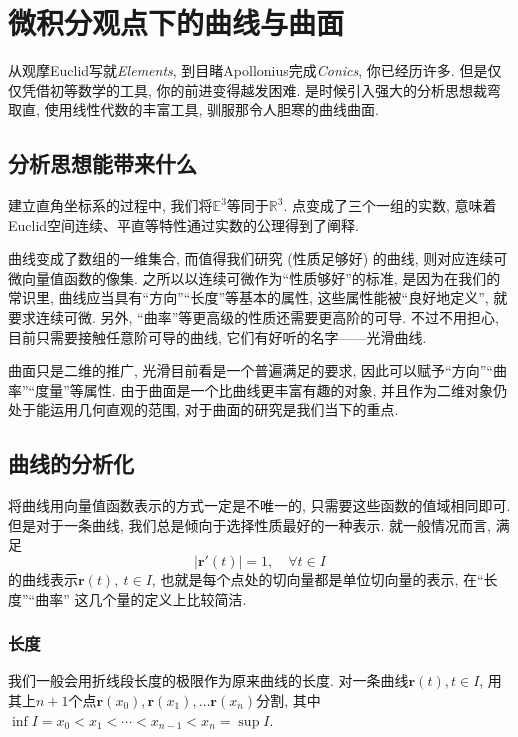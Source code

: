 \documentclass[./main.tex]{subfiles}
\begin{document}
\chapter{微积分观点下的曲线与曲面}
从观摩Euclid写就\textit{Elements}, 到目睹Apollonius完成\textit{Conics}, 你已经历许多. 但是仅仅凭借初等数学的工具, 你的前进变得越发困难. 是时候引入强大的分析思想裁弯取直, 使用线性代数的丰富工具, 驯服那令人胆寒的曲线曲面.
\section{分析思想能带来什么}
建立直角坐标系的过程中, 我们将\(\mathbb{E}^3\)等同于\(\mathbb{R}^3\). 点变成了三个一组的实数, 意味着Euclid空间连续、平直等特性通过实数的公理得到了阐释.

曲线变成了数组的一维集合, 而值得我们研究 (性质足够好) 的曲线, 则对应连续可微向量值函数的像集. 之所以以连续可微作为``性质够好''的标准, 是因为在我们的常识里, 曲线应当具有``方向''``长度''等基本的属性, 这些属性能被``良好地定义'', 就要求连续可微. 另外, ``曲率''等更高级的性质还需要更高阶的可导. 不过不用担心, 目前只需要接触任意阶可导的曲线, 它们有好听的名字——光滑曲线.

曲面只是二维的推广, 光滑目前看是一个普遍满足的要求, 因此可以赋予``方向''``曲率''``度量''等属性. 由于曲面是一个比曲线更丰富有趣的对象, 并且作为二维对象仍处于能运用几何直观的范围, 对于曲面的研究是我们当下的重点.
\section{曲线的分析化}
将曲线用向量值函数表示的方式一定是不唯一的, 只需要这些函数的值域相同即可. 但是对于一条曲线, 我们总是倾向于选择性质最好的一种表示. 就一般情况而言, 满足
\[
    \left|\mathbf{r}'(t)\right|=1,\quad\forall t\in I
\]
的曲线表示\(\mathbf{r}(t),\ t\in I\), 也就是每个点处的切向量都是单位切向量的表示, 在``长度''``曲率'' 这几个量的定义上比较简洁.
\subsection{长度}\label{sec:2}
我们一般会用折线段长度的极限作为原来曲线的长度. 对一条曲线\(\mathbf{r}(t),t\in I\), 用其上\(n+1\)个点\(\mathbf{r}(x_0),\mathbf{r}(x_1),\dots\mathbf{r}(x_n)\)分割, 其中\(\inf I=x_0<x_1<\cdots<x_{n-1}<x_n=\sup I\).
\end{document}
